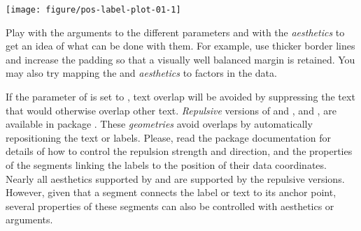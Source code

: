 \documentclass[krantz2]{krantz}\usepackage{knitr}%
\begin{document}
\label{start:plot:label}
\begin{knitrout}\footnotesize
{}\color{fgcolor}\begin{kframe}
\begin{alltt}
 \hlkwb{<-}
  \hlstd{(} \hlstd{=} \hlopt{:}\hlstd{,}  \hlstd{=} \hlstd{(}\hlstd{,} \hlstd{),}
              \hlstd{=} \hlstd{(}\hlstd{,} \hlstd{,} \hlstd{,} \hlstd{,} \hlstd{))}

    \hlopt{+}
  \hlstd{(} \hlstd{=} \hlopt{-}\hlstd{,}  \hlstd{=} \hlstd{,}
              \hlstd{=} \hlstd{,}
              \hlstd{=} \hlstd{(}\hlstd{,} \hlstd{),}
              \hlstd{=} \hlstd{(}\hlstd{,} \hlstd{),}
              \hlstd{=} \hlstd{,}  \hlstd{=} \hlstd{)} \hlopt{+}
  \hlstd{()} \hlopt{+}
  \hlstd{(} \hlstd{=} \hlstd{)}
\end{alltt}
\end{kframe}

{\centering \texttt{[image: figure/pos-label-plot-01-1]} 

}



\end{knitrout}

\begin{playground}
Play with the arguments to the different parameters and with the \emph{aesthetics} to get an idea of what can be done with them. For example, use thicker border lines and increase the padding so that a visually well balanced margin is retained. You may also try mapping the  and  \emph{aesthetics} to factors in the data.
\end{playground}

If the parameter  of  is set to , text overlap will be avoided by suppressing the text that would otherwise overlap other text.  \emph{Repulsive} versions of  and ,  and ,  are available in package . These \emph{geometries} avoid overlaps by automatically repositioning the text or labels. Please, read the package documentation for details of how to control the repulsion strength and direction, and the properties of the segments linking the labels to the position of their data coordinates. Nearly all aesthetics supported by  and  are supported by the repulsive versions. However, given that a segment connects the label or text to its anchor point, several properties of these segments can also be controlled with aesthetics or arguments.
\end{document}
